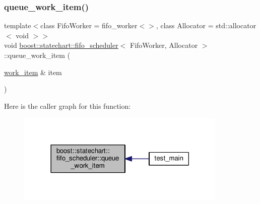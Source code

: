 \subsubsection{\texorpdfstring{queue\+\_\+work\+\_\+item()}{queue\_work\_item()}\hspace{0.1cm}{\footnotesize\ttfamily [1/2]}}
{\footnotesize\ttfamily template$<$class Fifo\+Worker = fifo\+\_\+worker$<$$>$, class Allocator = std\+::allocator$<$ void $>$$>$ \\
void \mbox{\hyperlink{classboost_1_1statechart_1_1fifo__scheduler}{boost\+::statechart\+::fifo\+\_\+scheduler}}$<$ Fifo\+Worker, Allocator $>$\+::queue\+\_\+work\+\_\+item (\begin{DoxyParamCaption}\item[{\mbox{\hyperlink{classboost_1_1statechart_1_1fifo__scheduler_a72ed2c30a2fa295c2e6909ff09754998}{work\+\_\+item}} \&}]{item }\end{DoxyParamCaption})\hspace{0.3cm}{\ttfamily [inline]}}

Here is the caller graph for this function\+:
\nopagebreak
\begin{figure}[H]
\begin{center}
\leavevmode
\includegraphics[width=285pt]{classboost_1_1statechart_1_1fifo__scheduler_a94caded752eb1e4226b2118e400067a3_icgraph}
\end{center}
\end{figure}
\mbox{\label{classboost_1_1statechart_1_1fifo__scheduler_a28cac5f086d4c677af0fdeb2973859dd}} 
